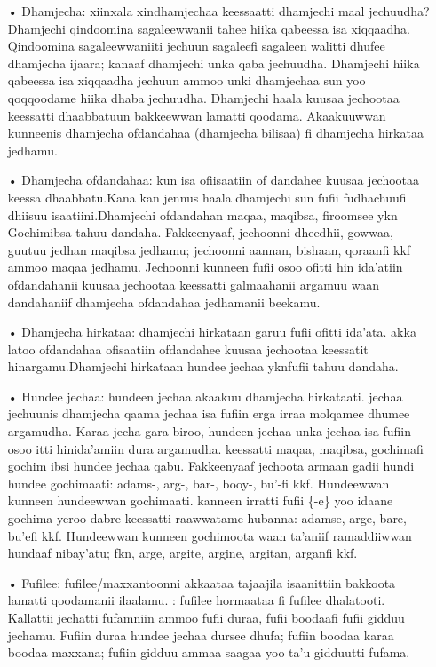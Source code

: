 \documentclass[11pt,b5paper]{book}
\begin{document}
\begin{itemize}
\begin{itemize}

\item[•] Dhamjecha: xiinxala xindhamjechaa keessaatti dhamjechi maal jechuudha? Dhamjechi qindoomina sagaleewwanii tahee hiika qabeessa isa xiqqaadha. Qindoomina sagaleewwaniiti jechuun sagaleefi sagaleen walitti dhufee dhamjecha ijaara; kanaaf dhamjechi unka qaba jechuudha. Dhamjechi hiika qabeessa isa xiqqaadha jechuun ammoo unki dhamjechaa sun yoo qoqqoodame hiika dhaba jechuudha. Dhamjechi haala kuusaa jechootaa keessatti dhaabbatuun bakkeewwan lamatti qoodama. Akaakuuwwan kunneenis dhamjecha ofdandahaa (dhamjecha bilisaa) fi dhamjecha hirkataa jedhamu. 

\item[•] Dhamjecha ofdandahaa: kun isa ofiisaatiin of dandahee kuusaa jechootaa keessa dhaabbatu.Kana kan jennus haala dhamjechi sun fufii fudhachuufi dhiisuu isaatiini.Dhamjechi ofdandahan maqaa, maqibsa, firoomsee ykn Gochimibsa tahuu dandaha.  Fakkeenyaaf, jechoonni dheedhii, gowwaa, guutuu jedhan maqibsa jedhamu; jechoonni aannan, bishaan, qoraanfi kkf ammoo maqaa jedhamu. Jechoonni kunneen fufii osoo ofitti hin ida’atiin ofdandahanii kuusaa jechootaa keessatti galmaahanii argamuu waan dandahaniif dhamjecha ofdandahaa jedhamanii beekamu.

\item[•] Dhamjecha hirkataa: dhamjechi hirkataan garuu fufii ofitti ida’ata. akka latoo ofdandahaa ofisaatiin ofdandahee kuusaa jechootaa keessatit hinargamu.Dhamjechi hirkataan hundee jechaa yknfufii tahuu dandaha.

\item[•] Hundee jechaa:  hundeen jechaa akaakuu dhamjecha hirkataati. jechaa jechuunis dhamjecha qaama jechaa isa fufiin erga irraa molqamee dhumee argamudha.  Karaa jecha gara biroo, hundeen jechaa unka jechaa isa fufiin osoo itti hinida’amiin dura argamudha. keessatti maqaa, maqibsa, gochimafi gochim ibsi hundee jechaa qabu.  Fakkeenyaaf jechoota armaan gadii hundi hundee gochimaati: adams-, arg-, bar-, booy-, bu’-fi kkf. Hundeewwan kunneen hundeewwan gochimaati. kanneen irratti fufii \{-e\} yoo idaane gochima yeroo dabre keessatti raawwatame hubanna: adamse, arge, bare, bu’efi kkf. Hundeewwan kunneen gochimoota waan ta'aniif ramaddiiwwan hundaaf nibay'atu; fkn, arge, argite, argine, argitan, arganfi kkf. 

\item[•] Fufilee: fufilee/maxxantoonni akkaataa tajaajila isaanittiin bakkoota lamatti qoodamanii ilaalamu. : fufilee hormaataa fi fufilee dhalatooti.  Kallattii jechatti fufamniin ammoo fufii duraa, fufii boodaafi fufii gidduu jechamu. Fufiin duraa hundee jechaa dursee dhufa; fufiin boodaa karaa boodaa maxxana; fufiin gidduu ammaa saagaa yoo ta’u gidduutti fufama. 


\end{itemize}
\end{itemize}
\end{document}
